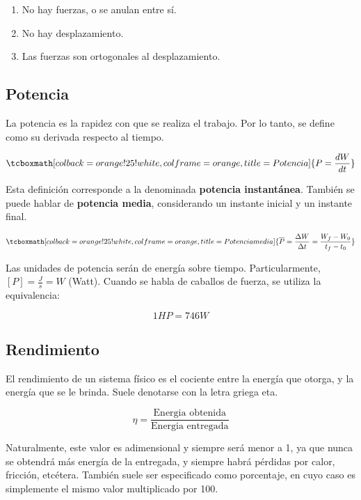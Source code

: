 \documentclass{article}
\begin{document}
\begin{enumerate}
\item No hay fuerzas, o se anulan entre sí.
\item No hay desplazamiento.
\item Las fuerzas son ortogonales al desplazamiento.
\end{enumerate}

\subsection{Potencia}

La potencia es la rapidez con que se realiza el trabajo. Por lo tanto, se define como su derivada respecto al tiempo.

\begin{equation}
\tcboxmath[colback=orange!25!white,colframe=orange,title=Potencia]{
P = \frac{\mathop{dW}}{\mathop{dt}}
}
\end{equation}

Esta definición corresponde a la denominada \textbf{potencia instantánea}. También se puede hablar de \textbf{potencia media}, considerando un instante inicial y un instante final.

\begin{equation}
\tcboxmath[colback=orange!25!white,colframe=orange,title=Potencia media]{
\overline{P} = \frac{\mathop{\Delta W}}{\mathop{\Delta t}} = \frac{W_f - W_0}{t_f - t_0}
}
\end{equation}

Las unidades de potencia serán de energía sobre tiempo. Particularmente, $[P] = \frac{J}{s} = W$ (Watt). Cuando se habla de caballos de fuerza, se utiliza la equivalencia:

\begin{equation}
1 HP = 746 W
\end{equation}

\subsection{Rendimiento}

El rendimiento de un sistema físico es el cociente entre la energía que otorga, y la energía que se le brinda. Suele denotarse con la letra griega eta.

\begin{equation}
\eta = \frac{\text{Energia obtenida}}{\text{Energia entregada}}
\end{equation}

Naturalmente, este valor es adimensional y siempre será menor a 1, ya que nunca se obtendrá más energía de la entregada, y siempre habrá pérdidas por calor, fricción, etcétera. También suele ser especificado como porcentaje, en cuyo caso es simplemente el mismo valor multiplicado por 100.
\end{document}
